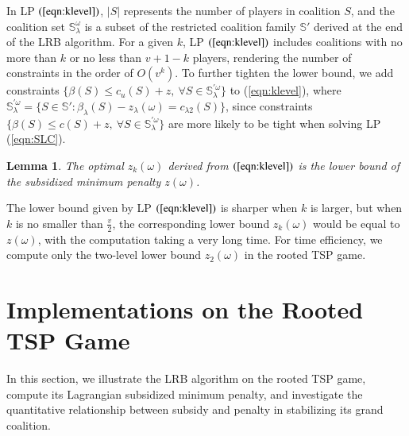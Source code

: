 \documentclass[authoryear,review,12pt]{elsarticle}
\newtheorem{lemma}{Lemma}
\begin{document}
In LP $(\ref{eqn:klevel})$, $|S|$ represents the number of players in coalition $S$, and the coalition set $\mathbb{S}^{\omega}_{\lambda}$ is a subset of the restricted coalition family $\mathbb{S}'$ derived at the end of the LRB algorithm. For a given $k$, LP $(\ref{eqn:klevel})$ includes coalitions with no more than $k$ or no less than $v+1-k$ players, rendering the number of constraints in the order of $O(v^k)$.
To further tighten the lower bound, we add constraints $\big\{\beta(S) \leq c_{u}(S)+z,~\forall S \in \mathbb{S}^{'\omega}_{\lambda} \big\}$ to (\ref{eqn:klevel}), where $\mathbb{S}^{'\omega}_{\lambda} = \big\{ S \in \mathbb{S}': \beta_{\lambda}(S) - z_{\lambda}(\omega) =  c_{\lambda2}(S) \big\}$, since constraints $\big\{\beta(S) \leq c(S)+z,~\forall S \in \mathbb{S}^{'\omega}_{\lambda} \big\}$ are more likely to be tight when solving LP (\ref{eqn:SLC}).


\begin{lemma}\label{lemma:lower}
The optimal $z_k(\omega)$ derived from $(\ref{eqn:klevel})$ is the lower bound of the subsidized minimum penalty $z(\omega)$.
\end{lemma}

The lower bound given by LP $(\ref{eqn:klevel})$ is sharper when $k$ is larger, but when $k$ is no smaller than $\frac{v}{2}$, the corresponding lower bound $z_k(\omega)$ would be equal to $z(\omega)$, with the computation taking a very long time. For time efficiency, we compute only the two-level lower bound $z_2(\omega)$ in the rooted TSP game.



\section{Implementations on the Rooted TSP Game}\label{section:TSP}
In this section, we illustrate the LRB algorithm on the rooted TSP game, compute its Lagrangian subsidized minimum penalty, and investigate the quantitative relationship between subsidy and penalty in stabilizing its grand coalition.
\end{document}

